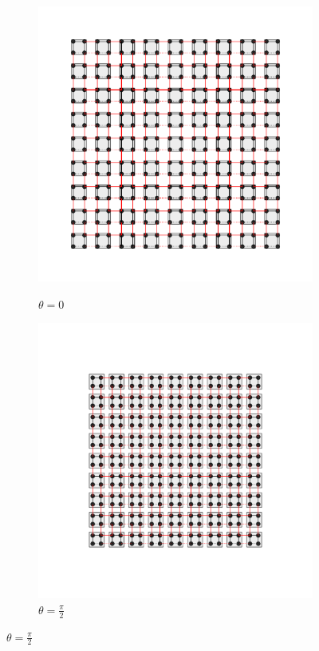 \begin{figure}[h!]
\begin{minipage}[h!]{1\textwidth}
\begin{subfigure}[b!]{0.2 \textwidth}
             \label{}
         \end{subfigure}\hspace*{-0.5em}
         \begin{subfigure}[b!]{0.2 \textwidth}
             \caption*{$\theta = 0$}
             \includegraphics[width=\textwidth]{Imagenes/Models/Model_pump/square_pump_model_xy_8.pdf}
             \label{}
         \end{subfigure}\hspace*{-0.5em}
         \begin{subfigure}[b!]{0.2 \textwidth}
             \caption*{$\theta = \frac{\pi}{2}$}
             \includegraphics[width=\textwidth]{Imagenes/Models/Model_pump/square_pump_model_xy_11.pdf}

\end{subfigure}
\end{minipage}
\end{figure}
